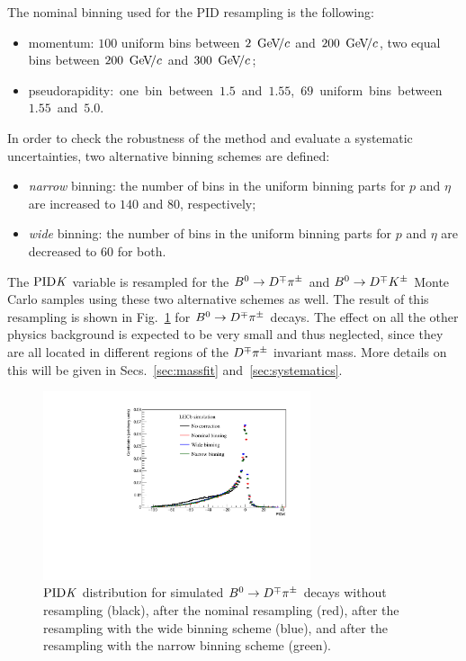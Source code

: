 The nominal binning used for the PID resampling is the following:
\begin{itemize}[noitemsep,topsep=0pt]
  \item momentum: $100$ uniform bins between $2~{\mathrm{\,Ge\kern -0.1em V\!/}c}$ and $200~{\mathrm{\,Ge\kern -0.1em V\!/}c}$, two equal bins between $200~{\mathrm{\,Ge\kern -0.1em V\!/}c}$ and $300~{\mathrm{\,Ge\kern -0.1em V\!/}c}$;
  \item pseudorapidity:~one~bin~between~$1.5$~and~$1.55$,~$69$~uniform~bins~between~$1.55$~and~$5.0$.
\end{itemize}
In order to check the robustness of the method and evaluate a systematic uncertainties, two alternative binning schemes are defined:
\begin{itemize}[noitemsep,topsep=0pt]
  \item \emph{narrow} binning: the number of bins in the uniform binning parts for $p$ and $\eta$ are increased to $140$ and $80$, respectively;
  \item \emph{wide} binning: the number of bins in the uniform binning parts for $p$ and $\eta$ are decreased to $60$ for both.
\end{itemize}
The $\rm{PID}\it{K}$ variable is resampled for the $B^0\rightarrow D^\mp\pi^\pm$ and $B^0\rightarrow D^\mp K^{\pm}$ Monte Carlo samples using these two alternative schemes as well. 
The result of this resampling is shown in Fig.~\ref{fig:pidkresampling} for $B^0\rightarrow D^\mp\pi^\pm$ decays.
The effect on all the other physics background is expected to be very small and thus neglected, since they are all located in different regions of the $D^\mp\pi^\pm$ invariant mass. More details on this will be given in Secs.~\ref{sec:massfit} and~\ref{sec:systematics}.
\begin{figure}[t]
        \begin{center}
                \includegraphics[width=0.7\textwidth]{02Selection/figs/PIDK_check_binning.pdf}
        \end{center}
        \vspace{-2mm}
        \caption{$\rm{PID}\it{K}$ distribution for simulated $B^0\rightarrow D^\mp\pi^\pm$ decays without resampling (black), after the nominal resampling (red),
        after the resampling with the wide binning scheme (blue), and after the resampling with the narrow binning scheme (green).}
        \label{fig:pidkresampling}
\end{figure}

